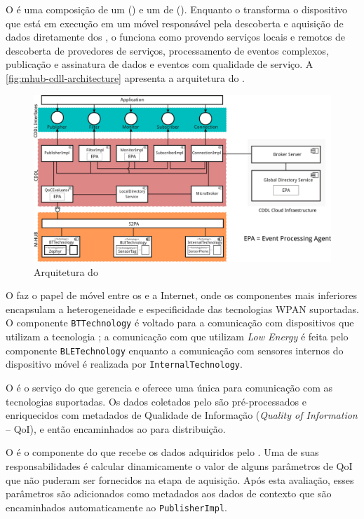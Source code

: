 O \mhubcddl é uma composição de um \gateway (\mhub) e um \middleware de \iomt (\cddl). Enquanto o \mhub transforma o dispositivo \android que está em execução em um \gateway \iot móvel responsável pela descoberta e aquisição de dados diretamente dos \smartobjs, o \cddl funciona como \middleware provendo serviços locais e remotos de descoberta de provedores de serviços, processamento de eventos complexos, publicação e assinatura de dados e eventos com qualidade de serviço.
A \autoref{fig:mhub-cdll-architecture} apresenta a arquitetura do \middleware.

\begin{figure}[htb]
	\centering
	\caption{\label{fig:mhub-cdll-architecture}Arquitetura do \mhubcddl}
	\includegraphics[width=0.85\linewidth]{img/mhub-cddl-architecture.png}
\end{figure}

O \mhub faz o papel de \gateway móvel entre os \smartobjs e a Internet, onde os componentes mais inferiores encapsulam a heterogeneidade e especificidade das tecnologias WPAN suportadas.
O componente \texttt{BTTechnology} é voltado para a comunicação com dispositivos que utilizam a tecnologia \Bluetooth; a comunicação com \smartobjs que utilizam \Bluetooth \textit{Low Energy} é feita pelo componente \texttt{BLETechnology} enquanto a comunicação com sensores internos do dispositivo móvel é realizada por \texttt{InternalTechnology}.

O \stwopa é o serviço do \mhub que gerencia e oferece uma \api única para comunicação com as tecnologias suportadas.
Os dados coletados pelo \stwopa são pré-processados e enriquecidos com metadados de Qualidade de Informação (\textit{Quality of Information} -- QoI), e então encaminhados ao \cddl para distribuição.

O \qocevaluator é o componente do \cddl que recebe os dados adquiridos pelo \mhub.
Uma de suas responsabilidades é calcular dinamicamente o valor de alguns parâmetros de QoI que não puderam ser fornecidos na etapa de aquisição.
Após esta avaliação, esses parâmetros são adicionados como metadados aos dados de contexto que são encaminhados automaticamente ao \texttt{PublisherImpl}.

